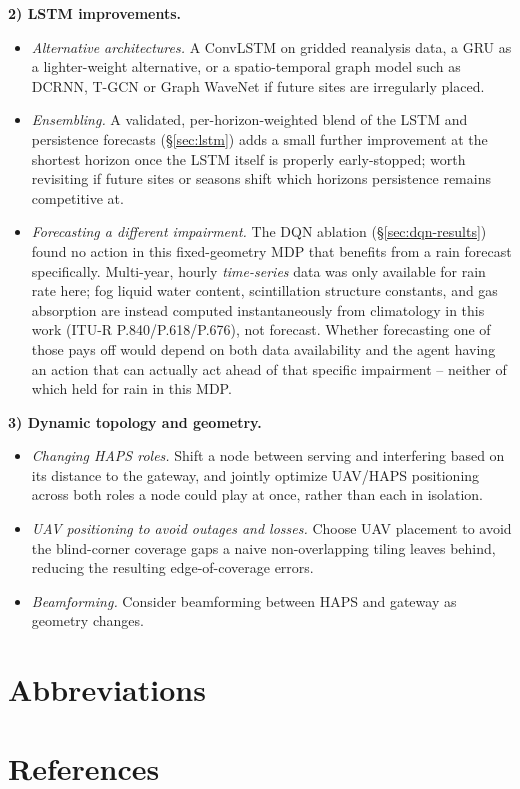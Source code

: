 \documentclass[]{ieeeaccess}
\begin{document}
\textbf{2) LSTM improvements.}
\begin{itemize}\setlength{\itemsep}{1pt}
  \item \emph{Alternative architectures.} A ConvLSTM on gridded reanalysis data, a GRU as a lighter-weight alternative, or a spatio-temporal graph model such as DCRNN, T-GCN or Graph WaveNet if future sites are irregularly placed.
  \item \emph{Ensembling.} A validated, per-horizon-weighted blend of the LSTM and persistence forecasts (\S\ref{sec:lstm}) adds a small further improvement at the shortest horizon once the LSTM itself is properly early-stopped; worth revisiting if future sites or seasons shift which horizons persistence remains competitive at.
  \item \emph{Forecasting a different impairment.} The DQN ablation (\S\ref{sec:dqn-results}) found no action in this fixed-geometry MDP that benefits from a rain forecast specifically. Multi-year, hourly \emph{time-series} data was only available for rain rate here; fog liquid water content, scintillation structure constants, and gas absorption are instead computed instantaneously from climatology in this work (ITU-R P.840/P.618/P.676), not forecast. Whether forecasting one of those pays off would depend on both data availability and the agent having an action that can actually act ahead of that specific impairment -- neither of which held for rain in this MDP.
\end{itemize}

\textbf{3) Dynamic topology and geometry.}
\begin{itemize}\setlength{\itemsep}{1pt}
  \item \emph{Changing HAPS roles.} Shift a node between serving and interfering based on its distance to the gateway, and jointly optimize UAV/HAPS positioning across both roles a node could play at once, rather than each in isolation.
  \item \emph{UAV positioning to avoid outages and losses.} Choose UAV placement to avoid the blind-corner coverage gaps a naive non-overlapping tiling leaves behind, reducing the resulting edge-of-coverage errors.
  \item \emph{Beamforming.} Consider beamforming between HAPS and gateway as geometry changes.
\end{itemize}

\section{Abbreviations}


\section{References}


\EOD
\end{document}

